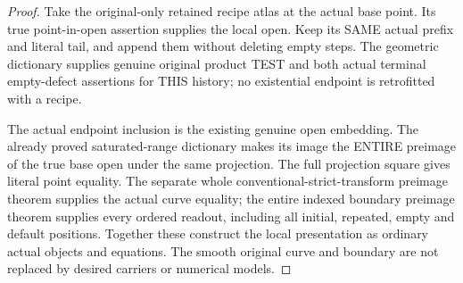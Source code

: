\begin{proof}
Take the original-only retained recipe atlas at the actual base point.
Its true point-in-open assertion supplies the local open. Keep its
SAME actual prefix and literal tail, and append them without deleting
empty steps. The geometric dictionary supplies genuine original
product TEST and both actual terminal empty-defect assertions for
THIS history; no existential endpoint is retrofitted with a recipe.

The actual endpoint inclusion is the existing genuine open embedding.
The already proved saturated-range dictionary makes its image the
ENTIRE preimage of the true base open under the same projection.
The full projection square gives literal point equality. The separate
whole conventional-strict-transform preimage theorem supplies the
actual curve equality; the entire indexed boundary preimage theorem
supplies every ordered readout, including all initial, repeated, empty
and default positions. Together these construct the local presentation
as ordinary actual objects and equations. The smooth original curve
and boundary are not replaced by desired carriers or numerical models.
\end{proof}

